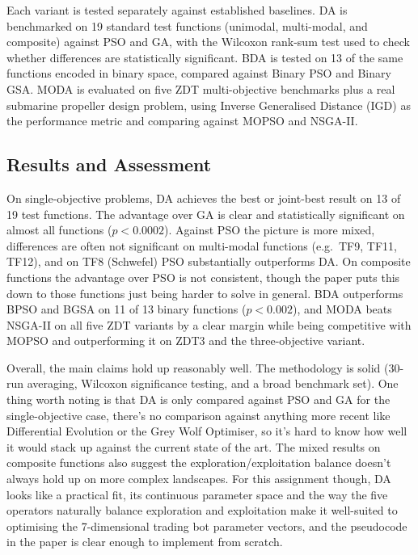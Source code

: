 \documentclass[11pt,a4paper]{article}
\begin{document}
Each variant is tested separately against established baselines.
DA is benchmarked on 19 standard test functions (unimodal, multi-modal, and
composite) against PSO and GA, with the Wilcoxon rank-sum test used to check
whether differences are statistically significant.
BDA is tested on 13 of the same functions encoded in binary space, compared
against Binary PSO and Binary GSA.
MODA is evaluated on five ZDT multi-objective benchmarks plus a real submarine
propeller design problem, using Inverse Generalised Distance (IGD) as the
performance metric and comparing against MOPSO and NSGA-II.


\subsection*{Results and Assessment}

On single-objective problems, DA achieves the best or joint-best result on 13 of
19 test functions.
The advantage over GA is clear and statistically significant on almost all
functions ($p < 0.0002$).
Against PSO the picture is more mixed, differences are often not significant
on multi-modal functions (e.g.\ TF9, TF11, TF12), and on TF8 (Schwefel) PSO
substantially outperforms DA.
On composite functions the advantage over PSO is not consistent, though the paper
puts this down to those functions just being harder to solve in general.
BDA outperforms BPSO and BGSA on 11 of 13 binary functions ($p < 0.002$), and
MODA beats NSGA-II on all five ZDT variants by a clear margin while being
competitive with MOPSO and outperforming it on ZDT3 and the three-objective variant.

Overall, the main claims hold up reasonably well.
The methodology is solid (30-run averaging, Wilcoxon significance testing, and
a broad benchmark set).
One thing worth noting is that DA is only compared against PSO and GA for the
single-objective case, there's no comparison against anything more recent like
Differential Evolution or the Grey Wolf Optimiser, so it's hard to know how well
it would stack up against the current state of the art.
The mixed results on composite functions also suggest the exploration/exploitation
balance doesn't always hold up on more complex landscapes.
For this assignment though, DA looks like a practical fit, its continuous
parameter space and the way the five operators naturally balance exploration and
exploitation make it well-suited to optimising the 7-dimensional trading bot
parameter vectors, and the pseudocode in the paper is clear enough to implement
from scratch.
\end{document}
